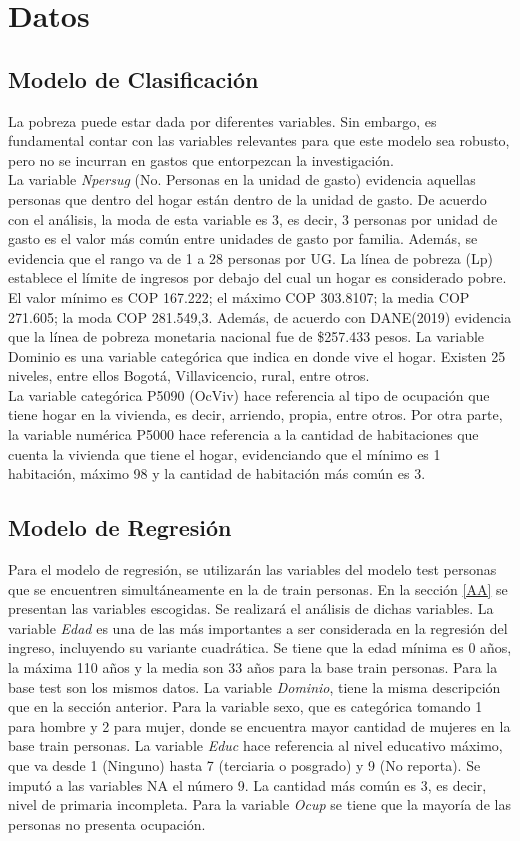 \documentclass[conference, 10pt]{IEEEtran}
\begin{document}
\section{Datos}
\subsection{Modelo de Clasificación}
La pobreza puede estar dada por diferentes variables. Sin embargo, es fundamental contar con las variables relevantes para que este modelo sea robusto, pero no se incurran en gastos que entorpezcan la investigación.\\
La variable \textit{Npersug} (No. Personas en la unidad de gasto) evidencia aquellas personas que dentro del hogar están dentro de la unidad de gasto. De acuerdo con el análisis, la moda de esta variable es 3, es decir, 3 personas por unidad de gasto es el valor más común entre unidades de gasto por familia. Además, se evidencia que el rango va de 1 a 28 personas por UG.
La línea de pobreza (Lp) establece el límite de ingresos por debajo del cual un hogar es considerado pobre. El valor mínimo es COP 167.222;  el máximo COP 303.8107; la media COP 271.605; la moda COP 281.549,3. Además, de acuerdo con DANE(2019) \cite{b1} evidencia que la línea de pobreza monetaria nacional fue de \$257.433 pesos.
La variable Dominio es una variable categórica que indica en donde vive el hogar. Existen 25 niveles, entre ellos Bogotá, Villavicencio, rural, entre otros. \\
La variable categórica P5090 (OcViv) hace referencia al tipo de ocupación que tiene hogar en la vivienda, es decir, arriendo, propia, entre otros. Por otra parte, la variable numérica P5000 hace referencia a la cantidad de habitaciones que cuenta la vivienda que tiene el hogar, evidenciando que el mínimo es 1 habitación, máximo 98 y la cantidad de habitación más común es 3.

\subsection{Modelo de Regresión}
Para el modelo de regresión, se utilizarán las variables del modelo test personas que se encuentren simultáneamente en la de train personas. En la sección \ref{AA} se presentan las variables escogidas. Se realizará el análisis de dichas variables. La variable \textit{Edad} es una de las más importantes a ser considerada en la regresión del ingreso, incluyendo su variante cuadrática. Se tiene que la edad mínima es 0 años, la máxima 110 años y la media son 33 años para la base train personas. Para la base test son los mismos datos. La variable \textit{Dominio}, tiene la misma descripción que en la sección anterior. Para la variable sexo, que es categórica tomando 1 para hombre y 2 para mujer, donde se encuentra mayor cantidad de mujeres en  la base train personas. La variable \textit{Educ} hace referencia al nivel educativo máximo, que va desde 1 (Ninguno) hasta 7 (terciaria o posgrado) y 9 (No reporta). Se imputó a las variables NA el número 9. La cantidad más común es 3, es decir, nivel de primaria incompleta. Para la variable \textit{Ocup} se tiene que la mayoría de las personas no presenta ocupación.
\end{document}
